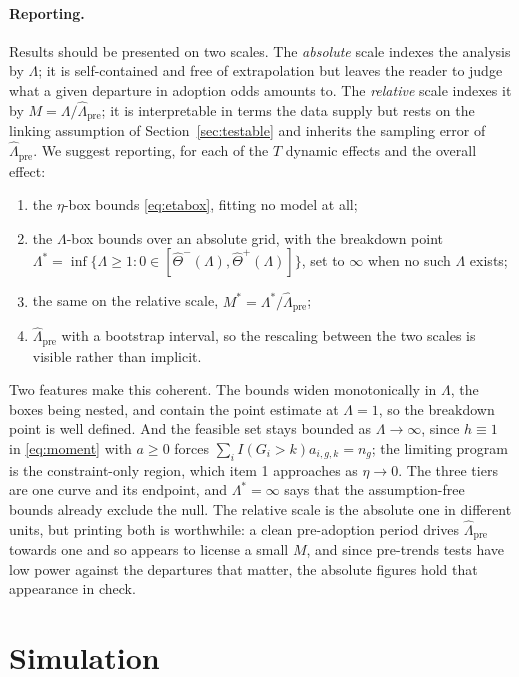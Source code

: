 \documentclass[12pt]{article}
\theoremstyle{remark}
\begin{document}
\paragraph{Reporting.} Results should be presented on two scales. The \emph{absolute}
scale indexes the analysis by $\Lambda$; it is self-contained and free of extrapolation
but leaves the reader to judge what a given departure in adoption odds amounts to. The
\emph{relative} scale indexes it by $M = \Lambda/\widehat\Lambda_{\mathrm{pre}}$; it is
interpretable in terms the data supply but rests on the linking assumption of
Section~\ref{sec:testable} and inherits the sampling error of
$\widehat\Lambda_{\mathrm{pre}}$. We suggest reporting, for each of the $T$ dynamic effects
and the overall effect:
\begin{enumerate}
\item the $\eta$-box bounds \eqref{eq:etabox}, fitting no model at all;
\item the $\Lambda$-box bounds over an absolute grid, with the breakdown point
$\Lambda^{*} = \inf\{\Lambda \ge 1 : 0 \in [\widehat\Theta^-(\Lambda), \widehat\Theta^+(\Lambda)]\}$,
set to $\infty$ when no such $\Lambda$ exists;
\item the same on the relative scale, $M^{*} = \Lambda^{*}/\widehat\Lambda_{\mathrm{pre}}$;
\item $\widehat\Lambda_{\mathrm{pre}}$ with a bootstrap interval, so the rescaling between
the two scales is visible rather than implicit.
\end{enumerate}

Two features make this coherent. The bounds widen monotonically in $\Lambda$, the boxes
being nested, and contain the point estimate at $\Lambda = 1$, so the breakdown point is
well defined. And the feasible set stays bounded as $\Lambda \to \infty$, since
$h \equiv 1$ in \eqref{eq:moment} with $a \ge 0$ forces
$\sum_i I(G_i{>}k)a_{i,g,k} = n_g$; the limiting program is the constraint-only region,
which item 1 approaches as $\eta \to 0$. The three tiers are one curve and its endpoint,
and $\Lambda^{*} = \infty$ says that the assumption-free bounds already exclude the null.
The relative scale is the absolute one in different units, but printing both is worthwhile:
a clean pre-adoption period drives $\widehat\Lambda_{\mathrm{pre}}$ towards one and so
appears to license a small $M$, and since pre-trends tests have low power against the
departures that matter, the absolute figures hold that appearance in check.

\section{Simulation}
\label{sec:sim}
\end{document}
